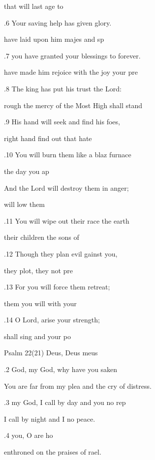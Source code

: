  that will last  age to  

.6 Your saving help has given  glory. 

 have laid upon him majes and sp 

.7 you have granted your blessings to  forever. 

 have made him rejoice with the joy  your pre 

.8 The king has put his trust  the Lord: 

rough the mercy of the Most High  shall stand  

.9 His hand will seek and find  his foes, 

 right hand find out  that hate  

.10 You will burn them like a blaz furnace 

 the day  you ap 

And the Lord will destroy them in  anger; 

 will low them  

.11 You will wipe out their race  the earth 

 their children  the sons of  

.12 Though they plan evil gainst you, 

 they plot, they  not pre 

.13 For you will force them  retreat; 

 them you will  with your  

.14 O Lord, arise  your strength; 

 shall sing and  your po 

Psalm 22(21) Deus, Deus meus 


.2  God, my God, why have you saken  

You are far from my plea and the cry of  distress. 

.3  my God, I call by day and you  no rep 

I call by night and I  no peace. 

.4  you, O  are ho 

enthroned on the praises of rael. 

